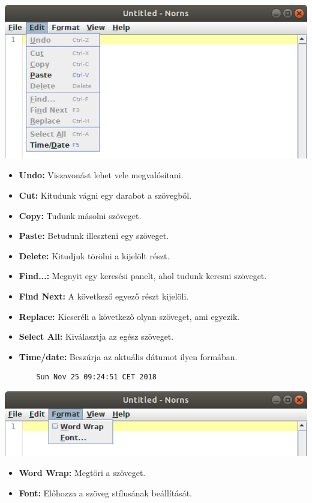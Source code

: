\documentclass[12pt]{article}
\begin{document}
\includegraphics[width = \textwidth]{EditMenu}
\begin{itemize}
  \item \textbf{Undo:} Viszavonást lehet vele megvalósítani.
  \item \textbf{Cut:} Kitudunk vágni egy darabot a szövegből.
  \item \textbf{Copy:} Tudunk másolni szöveget.
  \item \textbf{Paste:} Betudunk illeszteni egy szöveget.
  \item \textbf{Delete:} Kitudjuk törölni a kijelölt részt.
  \item \textbf{Find...:} Megnyit egy keresési panelt, ahol tudunk keresni szöveget.
  \item \textbf{Find Next:} A következő egyező részt kijelöli.
  \item \textbf{Replace:} Kicseréli a következő olyan szöveget, ami egyezik.
  \item \textbf{Select All:} Kiválasztja az egész szöveget.
  \item \textbf{Time/date:} Beszúrja az aktuális dátumot ilyen formában.
  \begin{lstlisting}
    Sun Nov 25 09:24:51 CET 2018
  \end{lstlisting}
\end{itemize}

\includegraphics[width = \textwidth]{FormatMenu}
\begin{itemize}
  \item \textbf{Word Wrap:} Megtöri a szöveget.
  \item \textbf{Font:} Előhozza a szöveg stílusának beállítását.
\end{itemize}
\end{document}
